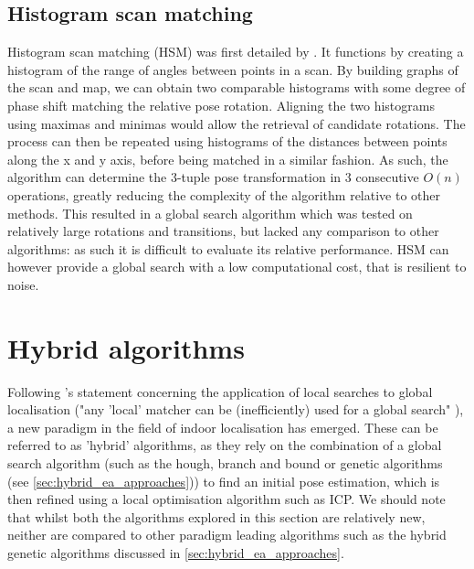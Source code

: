 \documentclass[authoryearcitations]{UoYCSproject}
\begin{document}
\subsection{Histogram scan matching}
Histogram scan matching (HSM) was first detailed by \citet{Weiss1994-ub}. It functions by creating a histogram of the range of angles between points in a scan. By building graphs of the scan and map, we can obtain two comparable histograms with some degree of phase shift matching the relative pose rotation. Aligning the two histograms using maximas and minimas would allow the retrieval of candidate rotations. The process can then be repeated using histograms of the distances between points along the x and y axis, before being matched in a similar fashion. As such, the algorithm can determine the 3-tuple pose transformation in 3 consecutive $O(n)$ operations, greatly reducing the complexity of the algorithm relative to other methods. This resulted in a global search algorithm which was tested on relatively large rotations and transitions, but lacked any comparison to other algorithms: as such it is difficult to evaluate its relative performance. HSM can however provide a global search with a low computational cost, that is resilient to noise.

\section{Hybrid algorithms}
\label{sec:hybrid_approaches}
Following \citet{Censi2005-iv}'s statement concerning the application of local searches to global localisation ("any 'local' matcher can be (inefficiently) used for a global search" \cite{Censi2005-iv}), a new paradigm in the field of indoor localisation has emerged. These can be referred to as 'hybrid' algorithms, as they rely on the combination of a global search algorithm (such as the hough, branch and bound or genetic algorithms (see \autoref{sec:hybrid_ea_approaches})) to find an initial pose estimation, which is then refined using a local optimisation algorithm such as ICP. We should note that whilst both the algorithms explored in this section are relatively new, neither are compared to other paradigm leading algorithms such as the hybrid genetic algorithms discussed in \autoref{sec:hybrid_ea_approaches}.
\end{document}
